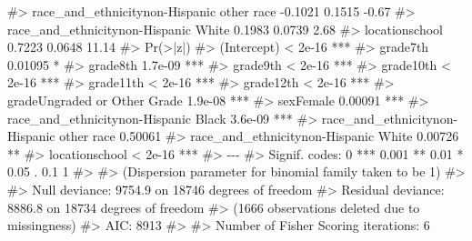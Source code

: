 \documentclass[
  letterpaper,
]{krantz}
\makeatletter
\newenvironment{Shaded}{\begin{snugshade}}{\end{snugshade}}
\newcommand{\CommentTok}[1]{\textcolor[rgb]{0.37,0.37,0.37}{#1}}
\newenvironment{kframe}{%
\medskip{}
\setlength{\fboxsep}{.8em}
 \def\at@end@of@kframe{}%
 \ifinner\ifhmode%
  \def\at@end@of@kframe{\end{minipage}}%
  \begin{minipage}{\columnwidth}%
 \fi\fi%
 \def\FrameCommand##1{\hskip\@totalleftmargin \hskip-\fboxsep
 \colorbox{shadecolor}{##1}\hskip-\fboxsep
     \hskip-\linewidth \hskip-\@totalleftmargin \hskip\columnwidth}%
 \MakeFramed {\advance\hsize-\width
   \@totalleftmargin\z@ \linewidth\hsize
   \@setminipage}}%
 {\par\unskip\endMakeFramed%
 \at@end@of@kframe}
\renewenvironment{Shaded}{\begin{kframe}}{\end{kframe}}
\makeatother
\begin{document}
\begin{Shaded}
\begin{Highlighting}[]
\CommentTok{\#\textgreater{} race\_and\_ethnicitynon{-}Hispanic other race  {-}0.1021     0.1515   {-}0.67}
\CommentTok{\#\textgreater{} race\_and\_ethnicitynon{-}Hispanic White        0.1983     0.0739    2.68}
\CommentTok{\#\textgreater{} locationschool                              0.7223     0.0648   11.14}
\CommentTok{\#\textgreater{}                                           Pr(\textgreater{}|z|)    }
\CommentTok{\#\textgreater{} (Intercept)                                \textless{} 2e{-}16 ***}
\CommentTok{\#\textgreater{} grade7th                                   0.01095 *  }
\CommentTok{\#\textgreater{} grade8th                                   1.7e{-}09 ***}
\CommentTok{\#\textgreater{} grade9th                                   \textless{} 2e{-}16 ***}
\CommentTok{\#\textgreater{} grade10th                                  \textless{} 2e{-}16 ***}
\CommentTok{\#\textgreater{} grade11th                                  \textless{} 2e{-}16 ***}
\CommentTok{\#\textgreater{} grade12th                                  \textless{} 2e{-}16 ***}
\CommentTok{\#\textgreater{} gradeUngraded or Other Grade               1.9e{-}08 ***}
\CommentTok{\#\textgreater{} sexFemale                                  0.00091 ***}
\CommentTok{\#\textgreater{} race\_and\_ethnicitynon{-}Hispanic Black       3.6e{-}09 ***}
\CommentTok{\#\textgreater{} race\_and\_ethnicitynon{-}Hispanic other race  0.50061    }
\CommentTok{\#\textgreater{} race\_and\_ethnicitynon{-}Hispanic White       0.00726 ** }
\CommentTok{\#\textgreater{} locationschool                             \textless{} 2e{-}16 ***}
\CommentTok{\#\textgreater{} {-}{-}{-}}
\CommentTok{\#\textgreater{} Signif. codes:  0 \textquotesingle{}***\textquotesingle{} 0.001 \textquotesingle{}**\textquotesingle{} 0.01 \textquotesingle{}*\textquotesingle{} 0.05 \textquotesingle{}.\textquotesingle{} 0.1 \textquotesingle{} \textquotesingle{} 1}
\CommentTok{\#\textgreater{} }
\CommentTok{\#\textgreater{} (Dispersion parameter for binomial family taken to be 1)}
\CommentTok{\#\textgreater{} }
\CommentTok{\#\textgreater{}     Null deviance: 9754.9  on 18746  degrees of freedom}
\CommentTok{\#\textgreater{} Residual deviance: 8886.8  on 18734  degrees of freedom}
\CommentTok{\#\textgreater{}   (1666 observations deleted due to missingness)}
\CommentTok{\#\textgreater{} AIC: 8913}
\CommentTok{\#\textgreater{} }
\CommentTok{\#\textgreater{} Number of Fisher Scoring iterations: 6}
\end{Highlighting}
\end{Shaded}
\end{document}
